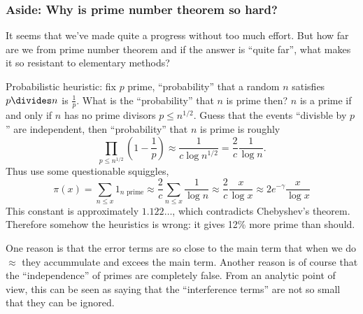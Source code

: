 \documentclass[a4paper]{article}
\begin{document}
\subsubsection{Aside: Why is prime number theorem so hard?}

It seems that we've made quite a progress without too much effort. But how far are we from prime number theorem and if the answer is ``quite far'', what makes it so resistant to elementary methods?

Probabilistic heuristic: fix \(p\) prime, ``probability'' that a random \(n\) satisfies \(p \divides n\) is \(\frac{1}{p}\). What is the ``probability'' that \(n\) is prime then? \(n\) is a prime if and only if \(n\) has no prime divisors \(p \leq n^{1/2}\). Guess that the events ``divisble by \(p\)'' are independent, then ``probability'' that \(n\) is prime is roughly
\[
  \prod_{p \leq n^{1/2}} \left( 1 - \frac{1}{p} \right)
  \approx \frac{1}{c \log n^{1/2}}
  = \frac{2}{c} \frac{1}{\log n}.
\]
Thus use some questionable squiggles,
\[
  \pi(x)
  = \sum_{n \leq x} 1_{n \text{ prime}}
  \approx \frac{2}{c} \sum_{n \leq x} \frac{1}{\log n}
  \approx \frac{2}{c} \frac{x}{\log x}
  \approx 2e^{-\gamma} \frac{x}{\log x}
\]
This constant is approximately \(1.122\dots\), which contradicts Chebyshev's theorem. Therefore somehow the heuristics is wrong: it gives 12\% more prime than should.

One reason is that the error terms are so close to the main term that when we do \(\approx\) they accummulate and excees the main term. Another reason is of course that the ``independence'' of primes are completely false. From an analytic point of view, this can be seen as saying that the ``interference terms'' are not so small that they can be ignored.
\end{document}
